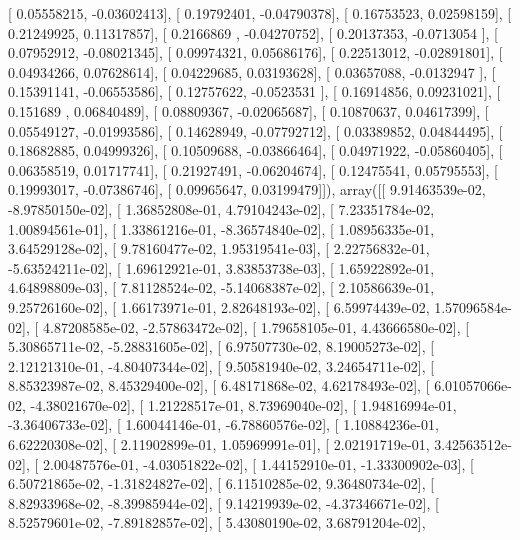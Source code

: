 \documentclass{article}
\begin{document}
       [ 0.05558215, -0.03602413],
       [ 0.19792401, -0.04790378],
       [ 0.16753523,  0.02598159],
       [ 0.21249925,  0.11317857],
       [ 0.2166869 , -0.04270752],
       [ 0.20137353, -0.0713054 ],
       [ 0.07952912, -0.08021345],
       [ 0.09974321,  0.05686176],
       [ 0.22513012, -0.02891801],
       [ 0.04934266,  0.07628614],
       [ 0.04229685,  0.03193628],
       [ 0.03657088, -0.0132947 ],
       [ 0.15391141, -0.06553586],
       [ 0.12757622, -0.0523531 ],
       [ 0.16914856,  0.09231021],
       [ 0.151689  ,  0.06840489],
       [ 0.08809367, -0.02065687],
       [ 0.10870637,  0.04617399],
       [ 0.05549127, -0.01993586],
       [ 0.14628949, -0.07792712],
       [ 0.03389852,  0.04844495],
       [ 0.18682885,  0.04999326],
       [ 0.10509688, -0.03866464],
       [ 0.04971922, -0.05860405],
       [ 0.06358519,  0.01717741],
       [ 0.21927491, -0.06204674],
       [ 0.12475541,  0.05795553],
       [ 0.19993017, -0.07386746],
       [ 0.09965647,  0.03199479]]), array([[  9.91463539e-02,  -8.97850150e-02],
       [  1.36852808e-01,   4.79104243e-02],
       [  7.23351784e-02,   1.00894561e-01],
       [  1.33861216e-01,  -8.36574840e-02],
       [  1.08956335e-01,   3.64529128e-02],
       [  9.78160477e-02,   1.95319541e-03],
       [  2.22756832e-01,  -5.63524211e-02],
       [  1.69612921e-01,   3.83853738e-03],
       [  1.65922892e-01,   4.64898809e-03],
       [  7.81128524e-02,  -5.14068387e-02],
       [  2.10586639e-01,   9.25726160e-02],
       [  1.66173971e-01,   2.82648193e-02],
       [  6.59974439e-02,   1.57096584e-02],
       [  4.87208585e-02,  -2.57863472e-02],
       [  1.79658105e-01,   4.43666580e-02],
       [  5.30865711e-02,  -5.28831605e-02],
       [  6.97507730e-02,   8.19005273e-02],
       [  2.12121310e-01,  -4.80407344e-02],
       [  9.50581940e-02,   3.24654711e-02],
       [  8.85323987e-02,   8.45329400e-02],
       [  6.48171868e-02,   4.62178493e-02],
       [  6.01057066e-02,  -4.38021670e-02],
       [  1.21228517e-01,   8.73969040e-02],
       [  1.94816994e-01,  -3.36406733e-02],
       [  1.60044146e-01,  -6.78860576e-02],
       [  1.10884236e-01,   6.62220308e-02],
       [  2.11902899e-01,   1.05969991e-01],
       [  2.02191719e-01,   3.42563512e-02],
       [  2.00487576e-01,  -4.03051822e-02],
       [  1.44152910e-01,  -1.33300902e-03],
       [  6.50721865e-02,  -1.31824827e-02],
       [  6.11510285e-02,   9.36480734e-02],
       [  8.82933968e-02,  -8.39985944e-02],
       [  9.14219939e-02,  -4.37346671e-02],
       [  8.52579601e-02,  -7.89182857e-02],
       [  5.43080190e-02,   3.68791204e-02],
\end{document}
